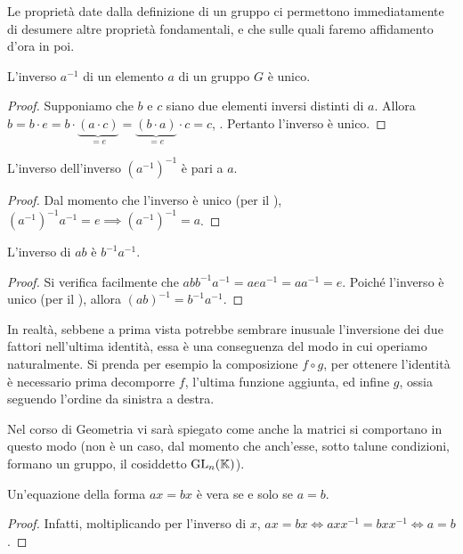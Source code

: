 Le proprietà date dalla definizione di un gruppo ci permettono immediatamente di desumere
altre proprietà fondamentali, e che sulle quali faremo affidamento d'ora in poi.

\begin{theorem}
    \label{th:gruppo:inverso_unico}
    L'inverso $a^{-1}$ di un elemento $a$ di un gruppo $G$ è unico.
\end{theorem}

\begin{proof}
    Supponiamo che $b$ e $c$ siano due elementi inversi distinti di $a$. Allora
    $b=b\cdot e=b\cdot \underbrace{(a \cdot c)}_{=e}=\underbrace{(b \cdot a)}_{=e} \cdot c=c$, \Lightning. Pertanto l'inverso è unico.
\end{proof}

\begin{theorem}
    L'inverso dell'inverso $\left(a^{-1}\right)^{-1}$ è pari a $a$.
\end{theorem}

\begin{proof}
    Dal momento che l'inverso è unico (per il ),
    $\left(a^{-1}\right)^{-1} a^{-1} = e \implies \left(a^{-1}\right)^{-1} = a$.
\end{proof}

\begin{theorem}
    L'inverso di $ab$ è $b^{-1}a^{-1}$.
\end{theorem}

\begin{proof}
    Si verifica facilmente che $ab b^{-1}a^{-1}= a e a^{-1} = a a^{-1} = e$. Poiché
    l'inverso è unico (per il ), allora
    $\left(ab\right)^{-1} = b^{-1}a^{-1}$.
\end{proof}

\begin{remark}
    In realtà, sebbene a prima vista potrebbe sembrare inusuale l'inversione dei due
    fattori nell'ultima identità, essa è una conseguenza del modo in cui operiamo
    naturalmente. Si prenda per esempio la composizione $f \circ g$, per ottenere
    l'identità è necessario prima decomporre $f$, l'ultima funzione aggiunta, ed infine
    $g$, ossia seguendo l'ordine da sinistra a destra.

    Nel corso di Geometria vi sarà spiegato come anche la matrici si comportano in
    questo modo (non è un caso, dal momento che anch'esse, sotto talune condizioni,
    formano un gruppo, il cosiddetto  $\operatorname{GL}_n(\mathbb{K})$).
\end{remark}

\begin{theorem}
    Un'equazione della forma $ax=bx$ è vera se e solo se $a=b$.
\end{theorem}

\begin{proof}
    Infatti, moltiplicando per l'inverso di $x$, $ax=bx \iff axx^{-1}=bxx^{-1} \iff a=b$.
\end{proof}


